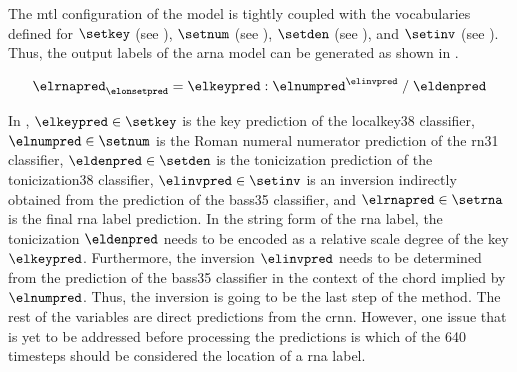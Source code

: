 
The \gls{mtl} configuration of the model is tightly coupled
with the vocabularies defined for $\setkey$ (see
), $\setnum$ (see
), $\setden$
(see ), and
$\setinv$ (see
). Thus, the
output labels of the \gls{arna} model can be generated as
shown in . 

\begin{equation}
    \label{eq:rna_pred}
    \elrnapred_{\elonsetpred} = \elkeypred : \elnumpred^{\elinvpred} \; / \; \eldenpred
\end{equation}

In , $\elkeypred \in \setkey$ is the key
prediction of the \gls{localkey38} classifier, $\elnumpred
\in \setnum$ is the Roman numeral numerator prediction of
the \gls{rn31} classifier, $\eldenpred \in \setden$ is the
tonicization prediction of the \gls{tonicization38}
classifier, $\elinvpred \in \setinv$ is an inversion
indirectly obtained from the prediction of the \gls{bass35}
classifier, and $\elrnapred \in \setrna$ is the final
\gls{rna} label prediction. In the string form of the
\gls{rna} label, the tonicization $\eldenpred$ needs to be
encoded as a relative scale degree of the key $\elkeypred$.
Furthermore, the inversion $\elinvpred$ needs to be
determined from the prediction of the \gls{bass35}
classifier in the context of the chord implied by
$\elnumpred$. Thus, the inversion is going to be the last
step of the method. The rest of the variables are direct
predictions from the \gls{crnn}. However, one issue that is
yet to be addressed before processing the predictions is
which of the 640 timesteps should be considered the location
of a \gls{rna} label. 

